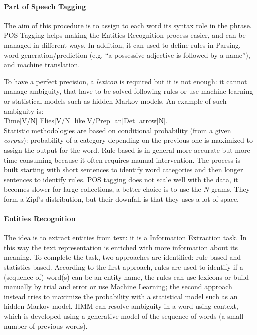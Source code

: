 \documentclass[11pt, a4page]{article}
\begin{document}
\paragraph{Part of Speech Tagging}
The aim of this procedure is to assign to each word its syntax role in the phrase.
POS Tagging helps making the Entities Recognition process easier, and can be managed in different ways.
In addition, it can used to define rules in Parsing, word generation/prediction (e.g. ``a possessive adjective is followed by a name''), and machine translation.

To have a perfect precision, a \textit{lexicon} is required but it is not enough: it cannot manage ambiguity, that have to be solved following rules or use machine learning or statistical models such as hidden Markov models. An example of such ambiguity is: \\Time[V/N] Flies[V/N] like[V/Prep] an[Det] arrow[N].\\
Statistic methodologies are based on conditional probability (from a given \textit{corpus}): probability of a category depending on the previous one is maximized to assign the output for the word.
Rule based is in general more accurate but more time consuming because it often requires manual intervention.
The process is built starting with short sentences to identify word categories and then longer sentences to identify rules.
POS tagging does not scale well with the data, it becomes slower for large collections, a better choice is to use the $N$-grams. They form a Zipf's distribution, but their downfall is that they uses a lot of space.

\paragraph{Entities Recognition}
The idea is to extract entities from text: it is a Information Extraction task.
In this way the text representation is enriched with more information about its meaning.
To complete the task, two approaches are identified: rule-based and statistics-based.
According to the first approach, rules are used to identify if a (sequence of) word(s) can be an entity name, the rules can use lexicons or build manually by trial and error or use Machine Learning; the second approach instead tries to maximize the probability with a statistical model such as an hidden Markov model.
HMM can resolve ambiguity in a word using context, which is developed using a generative model of the sequence of words (a small number of previous words).
\newline
\end{document}
